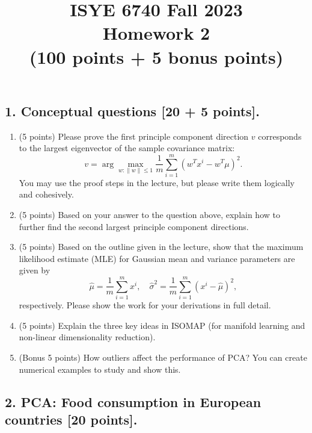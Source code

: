 \documentclass[twoside,10pt]{article}
\begin{document}
\title{ISYE 6740 Fall 2023\\ Homework 2 \\
(100 points + 5 bonus points)}
\date{}

\maketitle

\subsection*{1. Conceptual questions [20 + 5 points].}


\begin{enumerate}

\item (5 points) Please prove the first principle component direction $v$ corresponds to the largest eigenvector of the sample covariance matrix:
\[
v = \arg\max_{w: \|w\|\leq 1} \frac 1 m \sum_{i=1}^m (w^T x^i - w^T \mu)^2.
\]
You may use the proof steps in the lecture, but please write them logically and cohesively.

\item (5 points) Based on your answer to the question above, explain how to further find the second largest principle component directions.

\item (5 points) Based on the outline given in the lecture, show that the maximum likelihood estimate (MLE) for Gaussian mean and variance parameters are given by 
\[
\hat \mu = \frac 1 m \sum_{i=1}^m x^i, \quad \hat \sigma^2 = \frac 1 m \sum_{i=1}^m (x^i - \hat \mu)^2,
\]
respectively. Please show the work for your derivations in full detail.

\item (5 points) Explain the three key ideas in ISOMAP (for manifold learning and non-linear dimensionality reduction). 


\item (Bonus 5 points) How outliers affect the performance of PCA? You can create numerical examples to study and show this.

\end{enumerate}


\clearpage

\subsection*{2. PCA: Food consumption in European countries [20 points].}
\end{document}

